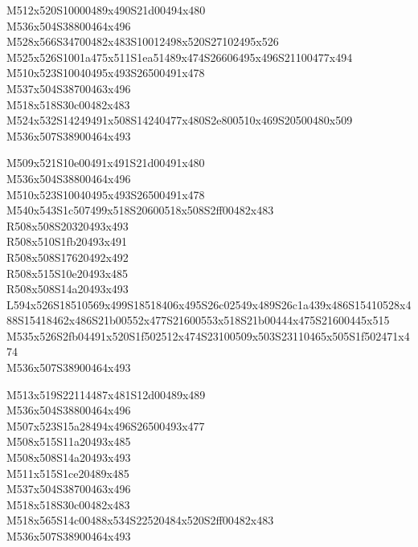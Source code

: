 \documentclass{article}
\begin{document}
\begin{multicols}{5}
\begin{center}

M512x520S10000489x490S21d00494x480 %
\\M536x504S38800464x496 %
\\M528x566S34700482x483S10012498x520S27102495x526 %
\\M525x526S1001a475x511S1ea51489x474S26606495x496S21100477x494 %
\\M510x523S10040495x493S26500491x478 %
\\M537x504S38700463x496 %
\\M518x518S30c00482x483 %
\\M524x532S14249491x508S14240477x480S2e800510x469S20500480x509 %
\\M536x507S38900464x493 %
\vfil
\columnbreak

M509x521S10e00491x491S21d00491x480 %
\\M536x504S38800464x496 %
\\M510x523S10040495x493S26500491x478 %
\\M540x543S1c507499x518S20600518x508S2ff00482x483 %
\\R508x508S20320493x493 %
\\R508x510S1fb20493x491 %
\\R508x508S17620492x492 %
\\R508x515S10e20493x485 %
\\R508x508S14a20493x493 %
\\L594x526S18510569x499S18518406x495S26c02549x489S26c1a439x486S15410528x488S15418462x486S21b00552x477S21600553x518S21b00444x475S21600445x515 %
\\M535x526S2fb04491x520S1f502512x474S23100509x503S23110465x505S1f502471x474 %
\\M536x507S38900464x493 %
\vfil
\columnbreak

M513x519S22114487x481S12d00489x489 %
\\M536x504S38800464x496 %
\\M507x523S15a28494x496S26500493x477 %
\\M508x515S11a20493x485 %
\\M508x508S14a20493x493 %
\\M511x515S1ce20489x485 %
\\M537x504S38700463x496 %
\\M518x518S30c00482x483 %
\\M518x565S14c00488x534S22520484x520S2ff00482x483 %
\\M536x507S38900464x493 %
\vfil
\columnbreak


\end{center}
\end{multicols}
\end{document}
